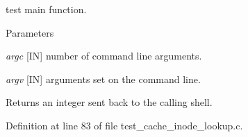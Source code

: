 test main function.


\begin{DoxyParams}{Parameters}
\item[{\em argc}][IN] number of command line arguments. \item[{\em argv}][IN] arguments set on the command line.\end{DoxyParams}
\begin{DoxyReturn}{Returns}
an integer sent back to the calling shell. 
\end{DoxyReturn}


Definition at line 83 of file test\_\-cache\_\-inode\_\-lookup.c.